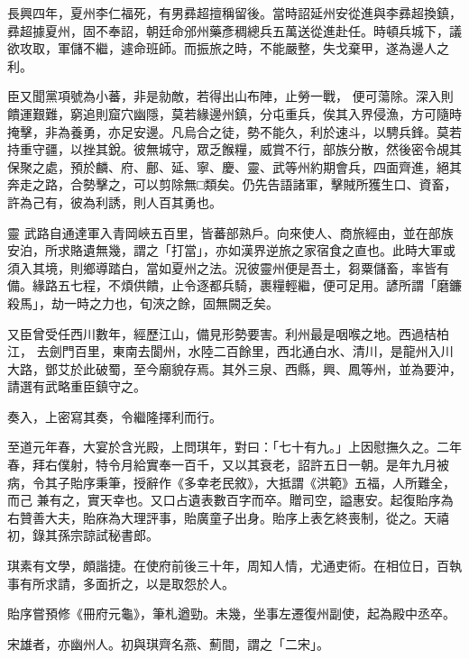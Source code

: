 \begin{pinyinscope}
 長興四年，夏州李仁福死，有男彞超擅稱留後。當時詔延州安從進與李彞超換鎮，彞超據夏州，固不奉詔，朝廷命邠州藥彥稠總兵五萬送從進赴任。時頓兵城下，議欲攻取，軍儲不繼，遽命班師。而振旅之時，不能嚴整，失戈棄甲，遂為邊人之利。



 臣又聞黨項號為小蕃，非是勍敵，若得出山布陣，止勞一戰，
 便可蕩除。深入則饋運艱難，窮追則窟穴幽隱，莫若緣邊州鎮，分屯重兵，俟其入界侵漁，方可隨時掩擊，非為養勇，亦足安邊。凡烏合之徒，勢不能久，利於速斗，以騁兵鋒。莫若持重守疆，以挫其銳。彼無城守，眾乏餱糧，威賞不行，部族分散，然後密令覘其保聚之處，預於麟、府、鄜、延、寧、慶、靈、武等州約期會兵，四面齊進，絕其奔走之路，合勢擊之，可以剪除無□類矣。仍先告語諸軍，擊賊所獲生口、資畜，許為己有，彼為利誘，則人百其勇也。



 靈
 武路自通達軍入青岡峽五百里，皆蕃部熟戶。向來使人、商旅經由，並在部族安泊，所求賂遺無幾，謂之「打當」，亦如漢界逆旅之家宿食之直也。此時大軍或須入其境，則鄉導踏白，當如夏州之法。況彼靈州便是吾土，芻粟儲畜，率皆有備。緣路五七程，不煩供饋，止令逐都兵騎，裹糧輕繼，便可足用。諺所謂「磨鐮殺馬」，劫一時之力也，旬浹之餘，固無闕乏矣。



 又臣曾受任西川數年，經歷江山，備見形勢要害。利州最是咽喉之地。西過桔柏江，
 去劍門百里，東南去閬州，水陸二百餘里，西北通白水、清川，是龍州入川大路，鄧艾於此破蜀，至今廟貌存焉。其外三泉、西縣，興、鳳等州，並為要沖，請選有武略重臣鎮守之。



 奏入，上密寫其奏，令繼隆擇利而行。



 至道元年春，大宴於含光殿，上問琪年，對曰：「七十有九。」上因慰撫久之。二年春，拜右僕射，特令月給實奉一百千，又以其衰老，詔許五日一朝。是年九月被病，令其子貽序秉筆，授辭作《多幸老民敘》，大抵謂《洪範》五福，人所難全，而己
 兼有之，實天幸也。又口占遺表數百字而卒。贈司空，謚惠安。起復貽序為右贊善大夫，貽庥為大理評事，貽廣童子出身。貽序上表乞終喪制，從之。天禧初，錄其孫宗諒試秘書郎。



 琪素有文學，頗諧捷。在使府前後三十年，周知人情，尤通吏術。在相位日，百執事有所求請，多面折之，以是取怨於人。



 貽序嘗預修《冊府元龜》，筆札遒勁。未幾，坐事左遷復州副使，起為殿中丞卒。



 宋雄者，亦幽州人。初與琪齊名燕、薊間，謂之「二宋」。




\end{pinyinscope}
